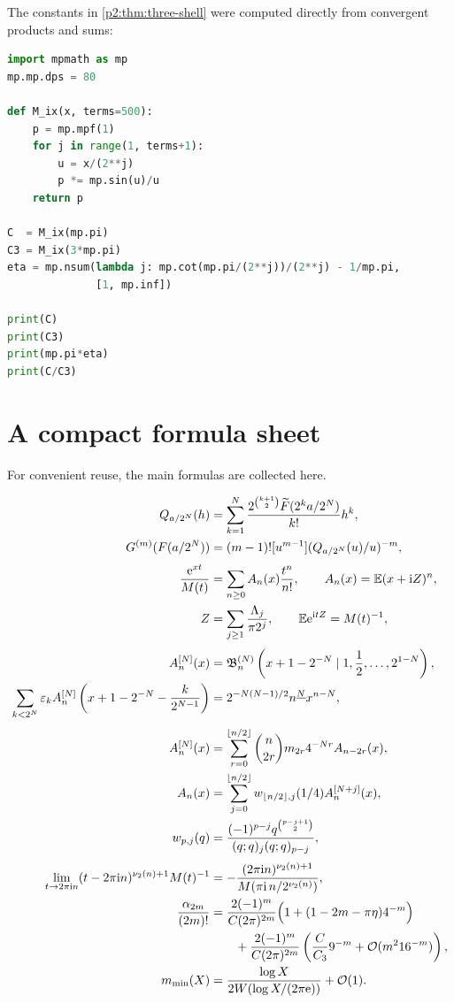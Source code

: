 \documentclass[11pt,oneside]{article}
\numberwithin{equation}{section}
\theoremstyle{definition}
\theoremstyle{remark}
\newcommand{\e}{\mathrm e}
\newcommand{\ii}{\mathrm i}
\newcommand{\eps}{\varepsilon}
\begin{document}
The constants in \cref{p2:thm:three-shell} were computed directly from convergent products and sums:
\begin{lstlisting}[style=frontiercode,language=Python,caption={High-precision evaluation of the pole constants.}]
import mpmath as mp
mp.mp.dps = 80

def M_ix(x, terms=500):
    p = mp.mpf(1)
    for j in range(1, terms+1):
        u = x/(2**j)
        p *= mp.sin(u)/u
    return p

C  = M_ix(mp.pi)
C3 = M_ix(3*mp.pi)
eta = mp.nsum(lambda j: mp.cot(mp.pi/(2**j))/(2**j) - 1/mp.pi,
              [1, mp.inf])

print(C)
print(C3)
print(mp.pi*eta)
print(C/C3)
\end{lstlisting}

\section{A compact formula sheet}
\label{p2:app:formula-sheet}

For convenient reuse, the main formulas are collected here.

\begin{align*}
 Q_{a/2^N}(h)
 &=\sum_{k=1}^{N}
 \frac{2^{\binom{k+1}{2}}\GF(2^ka/2^N)}{k!}h^k,\\
 G^{(m)}(F(a/2^N))
 &=(m-1)![u^{m-1}](Q_{a/2^N}(u)/u)^{-m},\\[0.3em]
 \frac{\e^{xt}}{M(t)}
 &=\sum_{n\ge0}A_n(x)\frac{t^n}{n!},
 \qquad
 A_n(x)=\mathbb E(x+\ii Z)^n,\\
 Z&=\sum_{j\ge1}\frac{\Lambda_j}{\pi2^j},
 \qquad
 \mathbb E\e^{\ii tZ}=M(t)^{-1},\\[0.3em]
 A_n^{[N]}(x)
 &=\mathfrak B_n^{(N)}
 \left(x+1-2^{-N}\mid1,\frac12,\ldots,2^{1-N}\right),\\
 \sum_{k<2^N}\eps_k
 A_n^{[N]}\left(x+1-2^{-N}-\frac{k}{2^{N-1}}\right)
 &=2^{-N(N-1)/2}\fall nN x^{n-N},\\[0.3em]
 A_n^{[N]}(x)
 &=\sum_{r=0}^{\lfloor n/2\rfloor}
 \binom n{2r}m_{2r}4^{-Nr}A_{n-2r}(x),\\
 A_n(x)
 &=\sum_{j=0}^{\lfloor n/2\rfloor}
 w_{\lfloor n/2\rfloor,j}(1/4)A_n^{[N+j]}(x),\\
 w_{p,j}(q)
 &=\frac{(-1)^{p-j}q^{\binom{p-j+1}{2}}}
 {(q;q)_j(q;q)_{p-j}},\\[0.3em]
 \lim_{t\to2\pi\ii n}(t-2\pi\ii n)^{\vtwo(n)+1}M(t)^{-1}
 &=-\frac{(2\pi\ii n)^{\vtwo(n)+1}}
 {M(\pi\ii\,n/2^{\vtwo(n)})},\\
 \frac{\alpha_{2m}}{(2m)!}
 &=\frac{2(-1)^m}{C(2\pi)^{2m}}
 \Bigl(1+(1-2m-\pi\eta)4^{-m}\Bigr)\\
 &\qquad+\frac{2(-1)^m}{C(2\pi)^{2m}}
 \left(\frac C{C_3}9^{-m}+\BigO(m^2 16^{-m})\right),\\
 m_{\min}(X)
 &=\frac{\log X}{2W(\log X/(2\pi\e))}+\BigO(1).
\end{align*}
\end{document}
